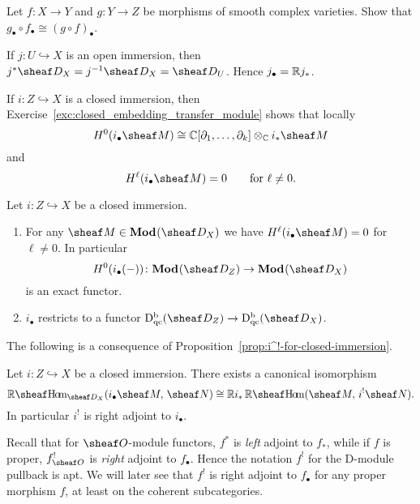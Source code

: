 \documentclass[number-in-sections,a4paper]{notes}
\begin{document}
\begin{Exercise}
    Let $f\colon X \to Y$ and $g\colon Y \to Z$ be morphisms of smooth complex varieties.
    Show that $g_\bullet \circ f_\bullet \cong (g \circ f)_\bullet$.
\end{Exercise}


\begin{Example}
    If $j\colon U \hookrightarrow X$ is an open immersion, then $j^*\sD_X = j^{-1}\sD_X = \sD_U$.
    Hence $j_\bullet = {\mathbb{R}} j_*$.
\end{Example}

\begin{Example}
    If $i\colon Z \hookrightarrow X$ is a closed immersion, then Exercise~\ref{exc:closed_embedding_transfer_module} shows that locally
    \[
        H^0(i_\bullet \sheaf M) \cong \CC[\partial_1,\dotsc,\partial_k] \otimes_\CC i_*\sheaf M
    \]
    and
    \[
        H^\ell(i_\bullet \sheaf M) = 0 \qquad \text{for } \ell \ne 0.
    \]
\end{Example}

\begin{Corollary}
    Let $i\colon Z \hookrightarrow X$ be a closed immersion.
    \begin{enumerate}
        \item For any $\sheaf M \in \catDMod{X}$ we have $H^\ell(i_\bullet \sheaf M) = 0$ for $\ell \ne 0$.
            In particular 
            \[
                H^0(i_\bullet (-))\colon \catDMod{Z} \to \catDMod{X}
            \]
            is an exact functor.
        \item $i_\bullet$ restricts to a functor $\catDbDModqc{Z} \to \catDbDModqc{X}$.
    \end{enumerate}
\end{Corollary}

The following is a consequence of Proposition~\ref{prop:i^!-for-closed-immersion}.

\begin{Proposition}
    Let $i\colon Z \hookrightarrow X$ be a closed immersion.
    There exists a canonical isomorphism
    \[
        \sheafRHom_{\sD_X}(i_\bullet \sheaf M,\, \sheaf N) \cong \RR i_*\sheafRHom(\sheaf M,\, i^!\sheaf N).
    \]
    In particular $i^!$ is right adjoint to $i_\bullet$.
\end{Proposition}

\begin{Remark}
    Recall that for $\sO$-module functors, $f^*$ is \emph{left} adjoint to $f_*$, while if $f$ is proper, $f_{\sO}^!$ is \emph{right} adjoint to $f_\bullet$.
    Hence the notation $f^!$ for the D-module pullback is apt.
    We will later see that $f^!$ is right adjoint to $f_\bullet$ for any proper morphism $f$, at least on the coherent subcategories.
\end{Remark}
\end{document}
